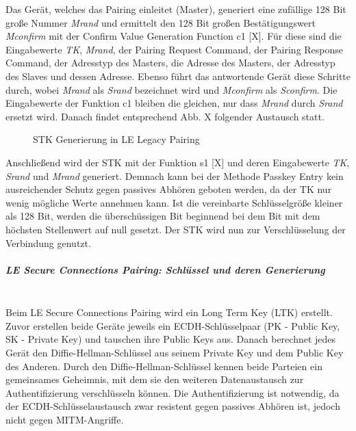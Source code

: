 Das Gerät, welches das Pairing einleitet (Master), generiert eine zufällige 128 Bit große Nummer \textit{Mrand} und ermittelt den 128 Bit großen Bestätigungswert \textit{Mconfirm} mit der Confirm Value Generation Function c1 [X]. 
Für diese sind die Eingabewerte \textit{TK}, \textit{Mrand}, der Pairing Request Command, der Pairing Response Command, der Adresstyp des Masters, die Adresse des Masters, der Adresstyp des Slaves und dessen Adresse. Ebenso führt das antwortende Gerät diese Schritte durch, wobei \textit{Mrand} als \textit{Srand} bezeichnet wird und \textit{Mconfirm} als \textit{Sconfirm}. Die Eingabewerte der Funktion c1 bleiben die gleichen, nur dass \textit{Mrand} durch \textit{Srand} ersetzt wird. Danach findet entsprechend Abb. X folgender Austausch statt.
\begin{figure}[hbt!]
    \centering
    \caption{STK Generierung in LE Legacy Pairing}
\end{figure}

Anschließend wird der STK mit der Funktion s1 [X] 
und deren Eingabewerte \textit{TK}, \textit{Srand} und \textit{Mrand} generiert. Demnach kann bei der Methode Passkey Entry kein ausreichender Schutz gegen passives Abhören geboten werden, da der TK nur wenig mögliche Werte annehmen kann. Ist die vereinbarte Schlüsselgröße kleiner als 128 Bit, werden die überschüssigen Bit beginnend bei dem Bit mit dem höchsten Stellenwert auf null gesetzt. Der STK wird nun zur Verschlüsselung der Verbindung genutzt.



\subparagraph{LE Secure Connections Pairing: Schlüssel und deren Generierung} \mbox{} \vspace{0.2cm} \\

Beim LE Secure Connections Pairing wird ein Long Term Key (LTK) erstellt. Zuvor erstellen beide Geräte jeweils ein ECDH-Schlüsselpaar (PK - Public Key, SK - Private Key) und tauschen ihre Public Keys aus. Danach berechnet jedes Gerät den Diffie-Hellman-Schlüssel aus seinem Private Key und dem Public Key des Anderen. Durch den Diffie-Hellman-Schlüssel kennen beide Parteien ein gemeinsames Geheimnis, mit dem sie den weiteren Datenaustausch zur Authentifizierung verschlüsseln können. Die Authentifizierung ist notwendig, da der ECDH-Schlüsselaustausch zwar resistent gegen passives Abhören ist, jedoch nicht gegen MITM-Angriffe.

